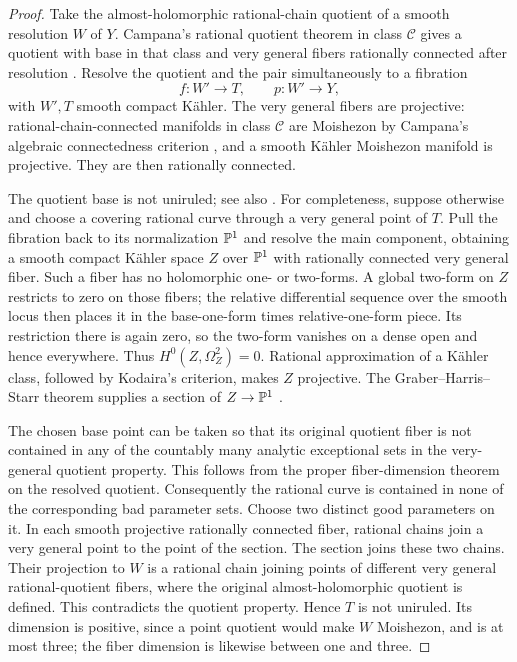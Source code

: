 \begin{proof}
Take the almost-holomorphic rational-chain quotient of a smooth
resolution \(W\) of \(Y\). Campana's rational quotient theorem in class
\(\mathcal C\) gives a quotient with base in that class and very general
fibers rationally connected after resolution
\cite[Theorem~2.6]{CampanaRationalQuotient}. Resolve the quotient and
the pair simultaneously to a fibration
\[
 f:W'\longrightarrow T,\qquad p:W'\longrightarrow Y,
\]
with \(W',T\) smooth compact Kähler. The very general fibers are
projective: rational-chain-connected manifolds in class \(\mathcal C\)
are Moishezon by Campana's algebraic connectedness criterion
\cite{CampanaAlgebraicConnectedness}, and a smooth Kähler Moishezon
manifold is projective. They are then rationally connected.

The quotient base is not uniruled; see also \cite[Lemma~8.10]{OuUniruledness}.
For completeness, suppose otherwise and choose a covering rational
curve through a very general point of \(T\). Pull the fibration back
to its normalization \(\mathbb{P}^1\) and resolve the main component, obtaining
a smooth compact Kähler space \(Z\) over \(\mathbb{P}^1\) with rationally
connected very general fiber. Such a fiber has no holomorphic one- or
two-forms. A global two-form on \(Z\) restricts to zero on those fibers;
the relative differential sequence over the smooth locus then places
it in the base-one-form times relative-one-form piece. Its restriction
there is again zero, so the two-form vanishes on a dense open and hence
everywhere. Thus \(H^0(Z,\Omega_Z^2)=0\). Rational approximation of a
Kähler class, followed by Kodaira's criterion, makes \(Z\) projective.
The Graber--Harris--Starr theorem supplies a section of
\(Z\to\mathbb{P}^1\) \cite{GraberHarrisStarr}.

The chosen base point can be taken so that its original quotient fiber
is not contained in any of the countably many analytic exceptional
sets in the very-general quotient property. This follows from the
proper fiber-dimension theorem on the resolved quotient. Consequently
the rational curve is contained in none of the corresponding bad
parameter sets. Choose two distinct good parameters on it. In each
smooth projective rationally connected fiber, rational chains join a
very general point to the point of the section. The section joins
these two chains. Their projection to \(W\) is a rational chain joining
points of different very general rational-quotient fibers, where the
original almost-holomorphic quotient is defined. This contradicts the
quotient property. Hence \(T\) is not uniruled. Its dimension is
positive, since a point quotient would make \(W\) Moishezon, and is at
most three; the fiber dimension is likewise between one and three.


\end{proof}

